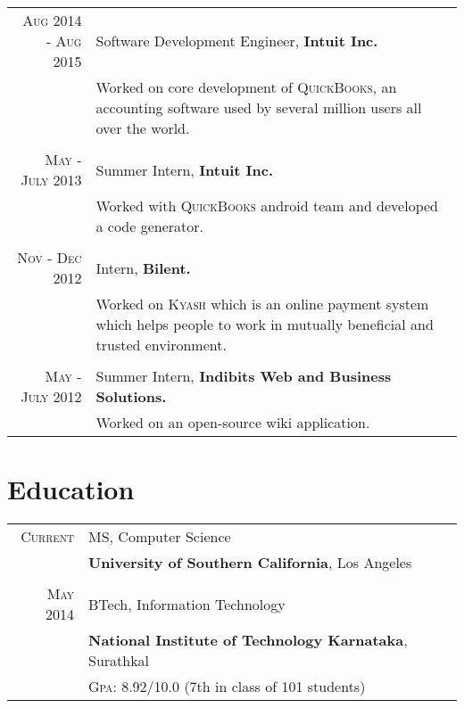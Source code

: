\documentclass[a4paper,10pt]{article} %
\begin{document}
\begin{tabular}{r|p{11cm}}
\textsc{Aug 2014 - Aug 2015} & Software Development Engineer, \textbf{Intuit Inc.} \\
& \footnotesize{Worked on core development of \textsc{QuickBooks}, an accounting software used by several million users all over the world.}\\
\multicolumn{2}{c}{} \\

\textsc{May - July 2013} & Summer Intern, \textbf{Intuit Inc.}\\ 
& \footnotesize{Worked with \textsc{QuickBooks} android  team and developed a code generator.}\\
\multicolumn{2}{c}{} \\


\textsc{Nov - Dec 2012} & Intern, \textbf{Bilent.}\\
& \footnotesize{Worked on \textsc{Kyash} which is an online payment system which helps people to
work in mutually beneficial and trusted environment.}\\
\multicolumn{2}{c}{} \\


\textsc{May - July 2012} & Summer Intern, \textbf{Indibits Web and Business Solutions.}\\
& \footnotesize{Worked on an open-source wiki application.}
\end{tabular}


\section{Education}

\begin{tabular}{rl}	

\textsc{Current} & MS, Computer Science \\
&\textbf{University of Southern California}, Los Angeles\\
\\

\textsc{May} 2014 & BTech, Information Technology\\
&\textbf{National Institute of Technology Karnataka}, Surathkal\\
& \textsc{Gpa}: 8.92/10.0 (7th in class of 101 students)\\

\end{tabular}
\end{document}
